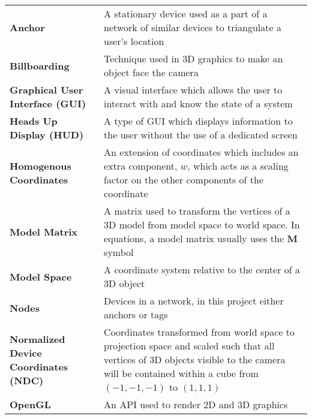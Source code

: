 \documentclass[
11pt, %
oneside, %
english, %
onehalfspacing, %
nolistspacing, %
hidelinks, %
headsepline, %
consistentlayout, %
table, %
]{MastersDoctoralThesis} %
\begin{document}

\tableofcontents %

\listoffigures %

\listoftables %


\addchap{\abbrevname}

\renewcommand\arraystretch{1.213}
\begin{longtable}{p{6cm} p{7cm}} 
\textbf{Anchor} & A stationary device used as a part of a network of similar devices to triangulate a user's location \\
\textbf{Billboarding} & Technique used in 3D graphics to make an object face the camera\\
\textbf{Graphical User Interface (GUI)} & A visual interface which allows the user to interact with and know the state of a system \\
\textbf{Heads Up Display (HUD)} & A type of GUI which displays information to the user without the use of a dedicated screen\\
\textbf{Homogenous Coordinates} & An extension of coordinates which includes an extra component, $w$, which acts as a scaling factor on the other components of the coordinate\\
\textbf{Model Matrix} & A matrix used to transform the vertices of a 3D model from model space to world space. In equations, a model matrix usually uses the $\mathbf{M}$ symbol \\
\textbf{Model Space} & A coordinate system relative to the center of a 3D object\\
\textbf{Nodes} & Devices in a network, in this project either anchors or tags\\
\textbf{Normalized Device Coordinates (NDC)} & Coordinates transformed from world space to projection space and scaled such that all vertices of 3D objects visible to the camera will be contained within a cube from $(-1, -1, -1)$ to $(1, 1, 1)$\\
\textbf{OpenGL} & An API used to render 2D and 3D graphics\\

\end{longtable}
\end{document}
